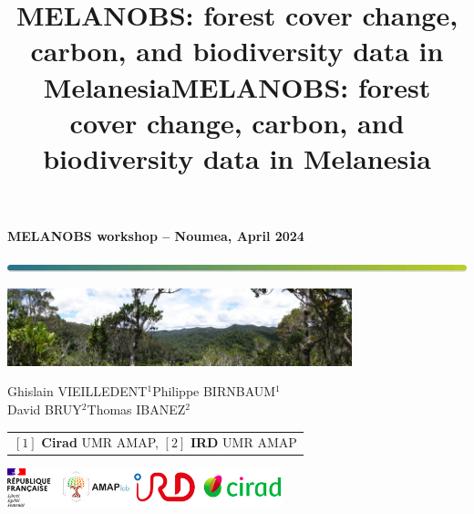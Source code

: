\documentclass[10pt,table,dvipsnames,compress]{beamer}
\date{}
\title{MELANOBS: forest cover change, carbon, and biodiversity data in Melanesia}
\title[MELANOBS]{MELANOBS: forest cover change, carbon, and biodiversity data in Melanesia}
\begin{document}

{
  \begin{frame}
  \begin{center}
  \small{\textbf{MELANOBS workshop -- Noumea, April 2024}}
  \end{center}
  \vspace{-0.5cm}
  \titlepage %
  \vspace{-3cm}
  \begin{center}
    \includegraphics[width=\textwidth]{figs/Barre_couleur}
    
    \vspace{0.25cm}
    
    \includegraphics[width=10cm]{figs/Banniere}
    
    \small{Ghislain VIEILLEDENT$^{1}$\hspace{0.25cm}Philippe BIRNBAUM$^{1}$\\
      \vspace{0.10cm}David BRUY$^{2}$\hspace{0.25cm}Thomas IBANEZ$^{2}$}
      
    \vspace{0.25cm}
    
    {\scriptsize
      \begin{tabular}{l}
        $[1]$ \textbf{Cirad} UMR AMAP, $[2]$ \textbf{IRD} UMR AMAP
      \end{tabular}
    }
    
    \includegraphics[width=0.6\textwidth]{figs/partners_logos}
    
  \end{center}
  \end{frame}
}
\end{document}
